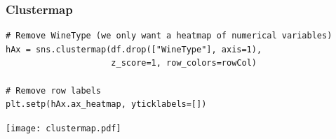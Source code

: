 \documentclass[xcolor=table]{beamer}
\begin{document}
\begin{frame}[fragile]
\frametitle{Clustermap}


\begin{lstlisting}[style=python]
# Remove WineType (we only want a heatmap of numerical variables)
hAx = sns.clustermap(df.drop(["WineType"], axis=1), 
                     z_score=1, row_colors=rowCol)

# Remove row labels
plt.setp(hAx.ax_heatmap, yticklabels=[])
\end{lstlisting}

\vspace{-0.7cm}
\begin{center}
	\texttt{[image: clustermap.pdf]}
\end{center}

\end{frame}


\end{document}
